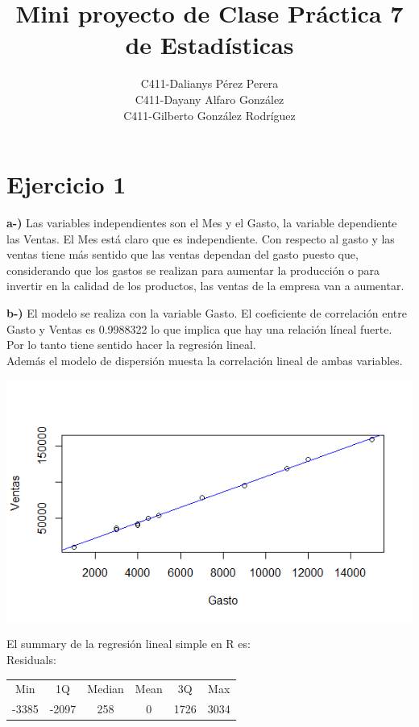 \documentclass[12pt,a4paper]{article}
\author{
	C411-Dalianys Pérez Perera\\C411-Dayany Alfaro González\\C411-Gilberto González Rodríguez
}
\date{}
\title{Mini proyecto de Clase Práctica 7 de Estadísticas}
\begin{document}
	\maketitle
	\section{Ejercicio 1}
	\textbf{a-)} Las variables independientes son el Mes y el Gasto, la variable dependiente las Ventas. El Mes está claro que es independiente. Con respecto al gasto y las ventas tiene más sentido que las ventas dependan del gasto puesto que, considerando que los gastos se realizan para aumentar la producción o para invertir en la calidad de los productos, las ventas de la empresa van a aumentar.
	
	\textbf{b-)} El modelo se realiza con la variable Gasto. El coeficiente de correlación entre Gasto y Ventas es 0.9988322 lo que implica que hay una relación líneal fuerte. Por lo tanto tiene sentido hacer la regresión lineal.\\
	Además el modelo de dispersión muesta la correlación lineal de ambas variables.\\
	\begin{center}
		\includegraphics[scale=0.8]{images/GxV.png}
	\end{center}
	
	El summary de la regresión lineal simple en R es:\\
	
	Residuals:\\

	\begin{tabular}{cccccc}
		Min&     1Q& Median& Mean&     3Q&    Max\\
		-3385&  -2097&    258& 0& 1726&   3034 
	\end{tabular}\\ 
	
\end{document}
